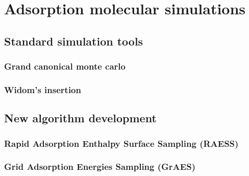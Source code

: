 \documentclass[main]{subfiles}
\begin{document}
\chapter{Adsorption molecular simulations}
\vspace*{-1\baselineskip}
\section{Standard simulation tools}

\subsection{Grand canonical monte carlo}

\subsection{Widom's insertion}

\section{New algorithm development}

\subsection{Rapid Adsorption Enthalpy Surface Sampling (RAESS)}

\subsection{Grid Adsorption Energies Sampling (GrAES)}

\OnlyInSubfile{\printglobalbibliography}
\end{document}
